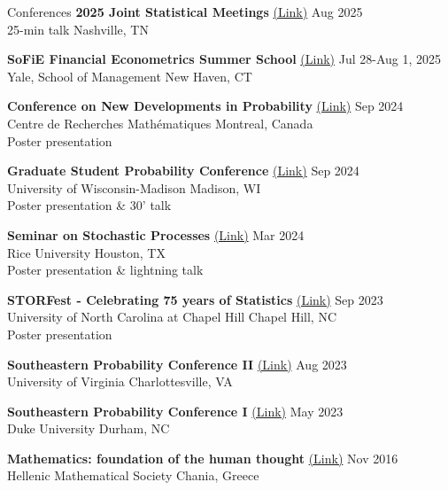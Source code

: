 \documentclass{resume} %
\begin{document}
\begin{rSection}{Conferences}
    {\bf 2025 Joint Statistical Meetings} \href{https://ww2.amstat.org/meetings/jsm/2025/}{(Link)} \hfill Aug 2025 \\ 
    25-min talk \hfill Nashville, TN

    {\bf SoFiE Financial Econometrics Summer School} \href{https://som.yale.edu/sofie-financial-econometrics-summer-school}{(Link)} \hfill Jul 28-Aug 1, 2025 \\
    Yale, School of Management \hfill New Haven, CT


    {\bf Conference on New Developments in Probability} \href{https://www.crmath.ca/en/activities/#/type/activity/id/3982}{(Link)} \hfill Sep 2024 \\ 
    Centre de Recherches Math\'ematiques \hfill Montreal, Canada \\ 
    Poster presentation

    {\bf Graduate Student Probability Conference} \href{https://sites.google.com/view/gspc-2024/home}{(Link)} \hfill Sep 2024 \\
    University of Wisconsin-Madison \hfill Madison, WI \\
    Poster presentation \& 30' talk

    {\bf Seminar on Stochastic Processes} \href{https://depts.washington.edu/ssproc/ssp_nextssp.php}{(Link)} \hfill Mar 2024 \\
    Rice University \hfill Houston, TX \\
    Poster presentation \& lightning talk

    {\bf STORFest - Celebrating 75 years of Statistics}
    \href{https://tarheels.live/storfest/}{(Link)} \hfill Sep 2023 \\
    University of North Carolina at Chapel Hill \hfill Chapel Hill, NC \\
    Poster presentation

    {\bf Southeastern Probability Conference II}
    \href{https://math.virginia.edu/2023/02/SEPC2/}{(Link)} \hfill Aug 2023 \\
    University of Virginia \hfill Charlottesville, VA 

    {\bf Southeastern Probability Conference I} \href{https://services.math.duke.edu/~rtd/SEPC2023/SEPC2023.html}{(Link)} \hfill May 2023 \\
    Duke University \hfill Durham, NC

    {\bf Mathematics: foundation of the human thought} \href{http://www.hms.gr/?q=node/1127}{(Link)} \hfill Nov 2016 \\
    Hellenic Mathematical Society  \hfill Chania, Greece
\end{rSection}
\end{document}
